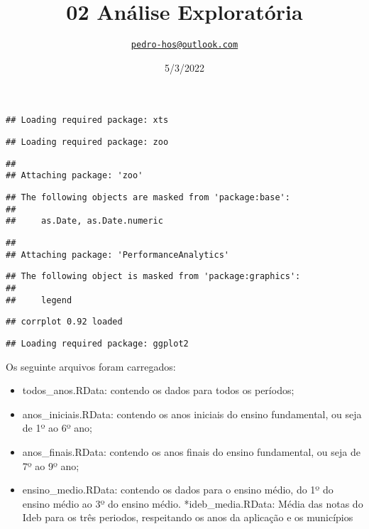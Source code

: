 \documentclass[
]{article}
\title{02 Análise Exploratória}
\author{\href{mailto:pedro-hos@outlook.com}{\nolinkurl{pedro-hos@outlook.com}}}
\date{5/3/2022}
\providecommand{\tightlist}{%
  \setlength{\itemsep}{0pt}\setlength{\parskip}{0pt}}
\begin{document}
\maketitle

\begin{verbatim}
## Loading required package: xts
\end{verbatim}

\begin{verbatim}
## Loading required package: zoo
\end{verbatim}

\begin{verbatim}
## 
## Attaching package: 'zoo'
\end{verbatim}

\begin{verbatim}
## The following objects are masked from 'package:base':
## 
##     as.Date, as.Date.numeric
\end{verbatim}

\begin{verbatim}
## 
## Attaching package: 'PerformanceAnalytics'
\end{verbatim}

\begin{verbatim}
## The following object is masked from 'package:graphics':
## 
##     legend
\end{verbatim}

\begin{verbatim}
## corrplot 0.92 loaded
\end{verbatim}

\begin{verbatim}
## Loading required package: ggplot2
\end{verbatim}

Os seguinte arquivos foram carregados:

\begin{itemize}
\tightlist
\item
  todos\_anos.RData: contendo os dados para todos os períodos;
\item
  anos\_iniciais.RData: contendo os anos iniciais do ensino fundamental,
  ou seja de 1º ao 6º ano;
\item
  anos\_finais.RData: contendo os anos finais do ensino fundamental, ou
  seja de 7º ao 9º ano;
\item
  ensino\_medio.RData: contendo os dados para o ensino médio, do 1º do
  ensino médio ao 3º do ensino médio. *ideb\_media.RData: Média das
  notas do Ideb para os três periodos, respeitando os anos da aplicação
  e os municípios
\end{itemize}
\end{document}

